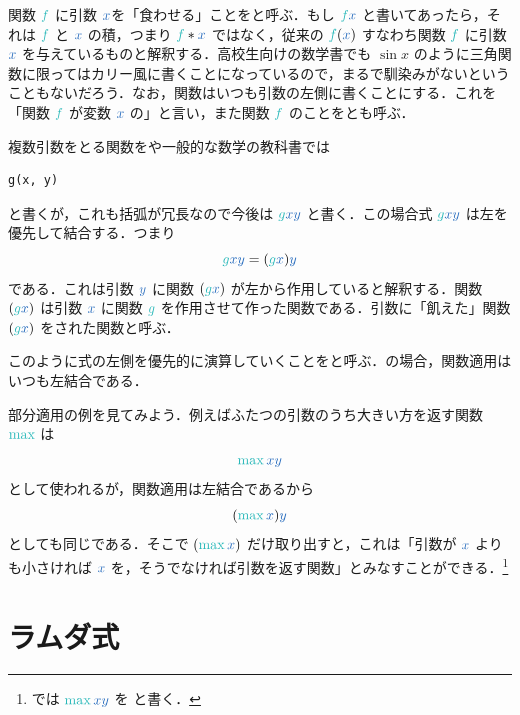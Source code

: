 \documentclass[a5paper,twoside,fleqn,draft]{jsbook}
\begin{document}

関数 $\hFunc{f}$ に引数 $\hVar{x}$を「食わせる」ことをと呼ぶ．もし $\hFunc{f}\hVar{x}$ と書いてあったら，それは $\hFunc{f}$ と $\hVar{x}$ の積，つまり $\hFunc{f}*\hVar{x}$ ではなく，従来の $\hFunc{f}(\hVar{x})$ すなわち関数 $\hFunc{f}$ に引数 $\hVar{x}$ を与えているものと解釈する．高校生向けの数学書でも $\sin x$ のように三角関数に限ってはカリー風に書くことになっているので，まるで馴染みがないということもないだろう．なお，関数はいつも引数の左側に書くことにする．これを「関数 $\hFunc{f}$ が変数 $\hVar{x}$ の」と言い，また関数 $\hFunc{f}$ のことをとも呼ぶ．

複数引数をとる関数を\python や一般的な数学の教科書では
\begin{pythoncode}
\begin{verbatim}
g(x, y)
\end{verbatim}
\end{pythoncode}
と書くが，これも括弧が冗長なので今後は $\hFunc{g}\hVar{x}\hVar{y}$ と書く．この場合式 $\hFunc{g}\hVar{x}\hVar{y}$ は左を優先して結合する．つまり
\begin{equation}
  \hFunc{g}\hVar{x}\hVar{y}=(\hFunc{g}\hVar{x})\hVar{y}
\end{equation}
である．これは引数 $\hVar{y}$ に関数 $(\hFunc{g}\hVar{x})$ が左から作用していると解釈する．関数 $(\hFunc{g}\hVar{x})$ は引数 $\hVar{x}$ に関数 $\hFunc{g}$ を作用させて作った関数である．引数に「飢えた」関数 $(\hFunc{g}\hVar{x})$ をされた関数と呼ぶ．

このように式の左側を優先的に演算していくことをと呼ぶ．\haskell の場合，関数適用はいつも左結合である．

部分適用の例を見てみよう．例えばふたつの引数のうち大きい方を返す関数
$\hMax$ は
\begin{equation}
  \hMax\hVar{x}\hVar{y}
\end{equation}
として使われるが，関数適用は左結合であるから
\begin{equation}
  (\hMax\hVar{x})\hVar{y}
\end{equation}
としても同じである．そこで $(\hMax\hVar{x})$ だけ取り出すと，これは「引数が $\hVar{x}$ よりも小さければ $\hVar{x}$ を，そうでなければ引数を返す関数」とみなすことができる．\footnote{\haskell では $\hMax\hVar{x}\hVar{y}$ を  と書く．}

\section{ラムダ式}
\end{document}
